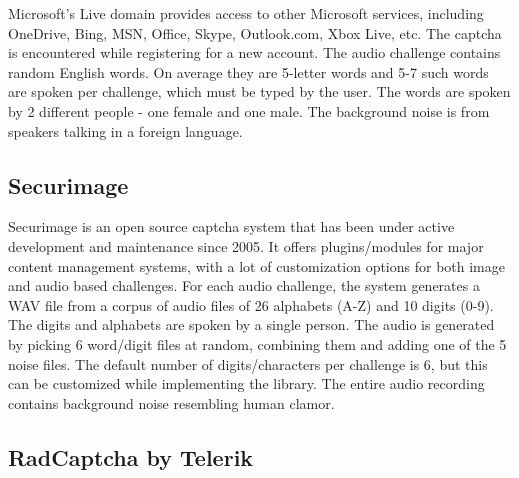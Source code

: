 Microsoft's Live domain provides access to other Microsoft services, including
 OneDrive, Bing, MSN, Office, Skype, Outlook.com, Xbox Live, etc. The captcha is 
 encountered while registering for a new account. The audio challenge contains random English 
 words. On average they are 5-letter words and 5-7 such words are spoken per challenge, which must be typed by the user.
The words are spoken by 2 different people - one female and one male. The background noise 
is from speakers talking in a foreign language.

\subsection{Securimage}

Securimage is an open source captcha system that has been under active development and maintenance 
since 2005. It offers plugins/modules for major content management systems, with a lot of customization 
options for both image and audio based challenges. For each audio challenge, the system generates a WAV 
file from a corpus of audio files of 26 alphabets (A-Z) and 10 digits (0-9). The digits and alphabets are 
spoken by a single person. The audio is generated by picking 6 word/digit files at random, combining them and adding one 
of the 5 noise files. The default number of digits/characters per challenge is 6, but this can 
be customized while implementing the library. The entire audio recording contains background noise resembling
human clamor.

\subsection{RadCaptcha by Telerik}

